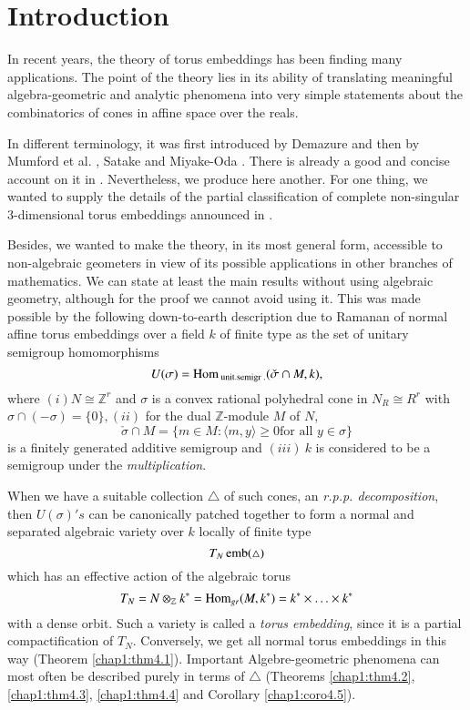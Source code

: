 \chapter{Introduction}

In recent years, the theory of torus embeddings has been finding many  
applications. The point of the theory lies in its  ability of
translating meaningful algebra-geometric and analytic phenomena into
very simple statements about the combinatorics of cones in affine
space over the reals. 

In different terminology, it was first introduced by Demazure \cite{keyD2}
and then by Mumford et al. \cite{keyTE}, Satake \cite{keyS1} and Miyake-Oda
\cite{keyMO}. There is already a good and concise account on it in
\cite{keyTE}. Nevertheless, we produce here another. For one thing, we
wanted to supply the details of the partial classification of complete
non-singular 3-dimensional torus embeddings announced in \cite{keyMO}. 

Besides, we wanted to make the theory, in its most general form,
accessible to non-algebraic geometers in view of its possible
applications in other branches of mathematics. We can state at least
the main results without using algebraic geometry, although for the
proof we cannot avoid using it. This was made possible by the
following down-to-earth description due to Ramanan of normal affine
torus embeddings over a field $k$ of finite type as the set of unitary
semigroup homomorphisms 
$$
U(\sigma) = \operatorname{Hom}_{\text { unit.semigr } .}(\check{\sigma} \cap M,k),  
$$
where $(i) N \cong \mathbb{Z}^r$ and $\sigma$ is a convex rational
polyhedral cone in $N_R \cong R^r$ with $\sigma \cap (-\sigma) =
\{0\},(ii)$ for the dual $\mathbb{Z}$-module $M$ of $N$, 
$$
\check{\sigma} \cap M = \{ m \in M: \langle m,y \rangle \ge 0 \text{
  for all } y \in \sigma \} 
$$
is a finitely generated additive semigroup and $(iii) ~k$ is
considered to be a semigroup under the \textit{multiplication}. 

When we have a suitable collection $\triangle$ of such cones, an
\textit{r.p.p. decomposition}, then $U(\sigma)'s$ can be canonically
patched together to form a normal and separated algebraic variety over
$k$ locally of finite type 
$$
T_N \operatorname{emb} (\triangle)
$$
which has an effective action of the algebraic torus 
$$
T_N = N \otimes_{\mathbb{Z}} k^* = \operatorname{Hom}_{gr} (M,k^*) = k^* \times
\ldots \times k^* 
$$
with a dense orbit. Such a variety is called a \textit{torus
  embedding}, since it is a partial compactification of
$T_N$. Conversely, we get all normal torus embeddings in this way 
(Theorem \ref{chap1:thm4.1}). Important Algebre-geometric phenomena can most often
be described purely in terms of $\triangle$ (Theorems
\ref{chap1:thm4.2}, \ref{chap1:thm4.3}, \ref{chap1:thm4.4} and
Corollary \ref{chap1:coro4.5}).  

